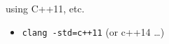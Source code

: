 \begin{frame}{using C++11, etc.}
\begin{itemize}
\item \texttt{clang -std=c++11} (or c++14 \ldots)
\end{itemize}
\end{frame}
